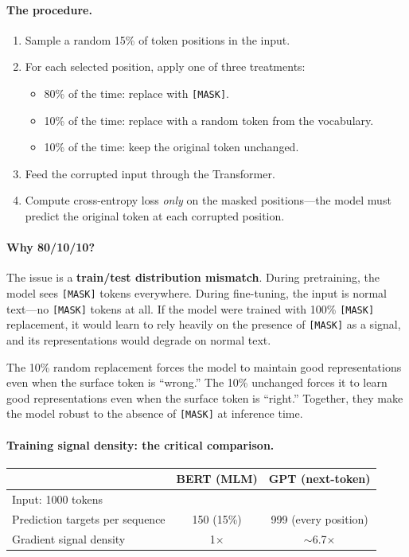 \paragraph{The procedure.}
\begin{enumerate}[nosep]
  \item Sample a random 15\% of token positions in the input.
  \item For each selected position, apply one of three treatments:
    \begin{itemize}[nosep]
      \item 80\% of the time: replace with \texttt{[MASK]}.
      \item 10\% of the time: replace with a random token from the vocabulary.
      \item 10\% of the time: keep the original token unchanged.
    \end{itemize}
  \item Feed the corrupted input through the Transformer.
  \item Compute cross-entropy loss \emph{only} on the masked positions---the model must predict the original token at each corrupted position.
\end{enumerate}

\paragraph{Why 80/10/10?} The issue is a \textbf{train/test distribution mismatch}. During pretraining, the model sees \texttt{[MASK]} tokens everywhere. During fine-tuning, the input is normal text---no \texttt{[MASK]} tokens at all. If the model were trained with 100\% \texttt{[MASK]} replacement, it would learn to rely heavily on the presence of \texttt{[MASK]} as a signal, and its representations would degrade on normal text.

The 10\% random replacement forces the model to maintain good representations even when the surface token is ``wrong.'' The 10\% unchanged forces it to learn good representations even when the surface token is ``right.'' Together, they make the model robust to the absence of \texttt{[MASK]} at inference time.

\paragraph{Training signal density: the critical comparison.}

\begin{center}
\begin{tabular}{lcc}
\toprule
& \textbf{BERT (MLM)} & \textbf{GPT (next-token)} \\
\midrule
Input: 1000 tokens & & \\
Prediction targets per sequence & 150 (15\%) & 999 (every position) \\
Gradient signal density & 1$\times$ & $\sim$6.7$\times$ \\
\bottomrule
\end{tabular}
\end{center}

